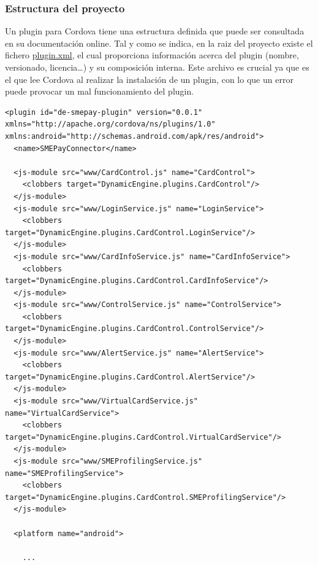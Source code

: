 \documentclass[a4paper, 12pt]{article}
\newenvironment{code}{\captionsetup{type=listing}}{}
\begin{document}
\subsubsection{Estructura del proyecto}
\label{sec-4-3-1}
Un plugin para Cordova tiene una estructura definida que puede ser consultada en su documentación online\cite{Cordova}. Tal y como se indica, en la raiz del proyecto existe el fichero \hyperref[code:pluginxml]{plugin.xml},
el cual proporciona información acerca del plugin (nombre, versionado, licencia\ldots{}) y su composición interna. Este archivo es crucial ya que es el que lee Cordova al realizar la instalación de un plugin,
con lo que un error puede provocar un mal funcionamiento del plugin.
\begin{code}
\label{code:pluginxml}
\begin{verbatim}
<plugin id="de-smepay-plugin" version="0.0.1" xmlns="http://apache.org/cordova/ns/plugins/1.0" xmlns:android="http://schemas.android.com/apk/res/android">
  <name>SMEPayConnector</name>

  <js-module src="www/CardControl.js" name="CardControl">
    <clobbers target="DynamicEngine.plugins.CardControl"/>
  </js-module>
  <js-module src="www/LoginService.js" name="LoginService">
    <clobbers target="DynamicEngine.plugins.CardControl.LoginService"/>
  </js-module>
  <js-module src="www/CardInfoService.js" name="CardInfoService">
    <clobbers target="DynamicEngine.plugins.CardControl.CardInfoService"/>
  </js-module>
  <js-module src="www/ControlService.js" name="ControlService">
    <clobbers target="DynamicEngine.plugins.CardControl.ControlService"/>
  </js-module>
  <js-module src="www/AlertService.js" name="AlertService">
    <clobbers target="DynamicEngine.plugins.CardControl.AlertService"/>
  </js-module>
  <js-module src="www/VirtualCardService.js" name="VirtualCardService">
    <clobbers target="DynamicEngine.plugins.CardControl.VirtualCardService"/>
  </js-module>
  <js-module src="www/SMEProfilingService.js" name="SMEProfilingService">
    <clobbers target="DynamicEngine.plugins.CardControl.SMEProfilingService"/>
  </js-module>

  <platform name="android">

    ...


\end{verbatim}
\end{code}
\end{document}
